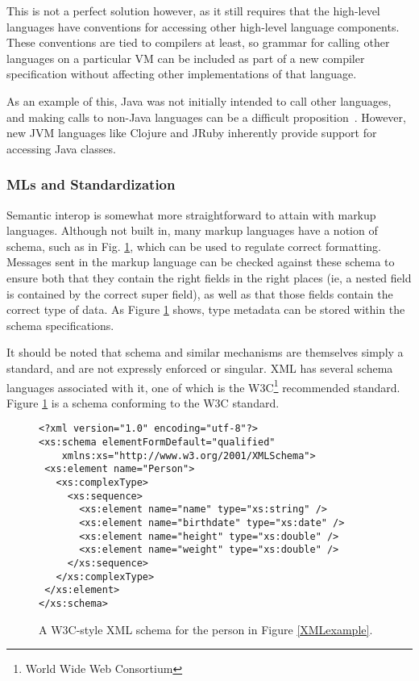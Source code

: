 \documentclass{sig-alternate}
\begin{document}
This is not a perfect solution however, as it still requires that the high-level languages have conventions for accessing other high-level language components.
These conventions are tied to compilers at least, so grammar for calling other languages on a particular VM can be included as part of a new compiler specification without affecting other implementations of that language.

As an example of this, Java was not initially intended to call other languages, and making calls to non-Java languages can be a difficult proposition~\cite{Chisnall:2013}. However, new JVM languages like Clojure and JRuby inherently provide support for accessing Java classes.


\subsubsection*{MLs and Standardization}
Semantic interop is somewhat more straightforward to attain with markup languages. Although not built in, many markup languages have a notion of schema, such as in Fig. \ref{XMLschema}, which can be used to regulate correct formatting. Messages sent in the markup language can be checked against these schema to ensure both that they contain the right fields in the right places (ie, a nested field is contained by the correct super field), as well as that those fields contain the correct type of data. As Figure \ref{XMLschema} shows, type metadata can be stored within the schema specifications.

It should be noted that schema and similar mechanisms are themselves simply a standard, and are not expressly enforced or singular. XML has several schema languages associated with it, one of which is the W3C\footnote{World Wide Web Consortium} recommended standard. Figure \ref{XMLschema} is a schema conforming to the W3C standard.


\begin{figure}
\begin{verbatim}
<?xml version="1.0" encoding="utf-8"?>
<xs:schema elementFormDefault="qualified"
    xmlns:xs="http://www.w3.org/2001/XMLSchema">
 <xs:element name="Person">
   <xs:complexType>
     <xs:sequence>
       <xs:element name="name" type="xs:string" />
       <xs:element name="birthdate" type="xs:date" />
       <xs:element name="height" type="xs:double" />
       <xs:element name="weight" type="xs:double" />
     </xs:sequence>
   </xs:complexType>
 </xs:element>
</xs:schema>
\end{verbatim}
\caption{A W3C-style XML schema for the person in Figure \ref{XMLexample}.}
\label{XMLschema}
\end{figure}
\end{document}
